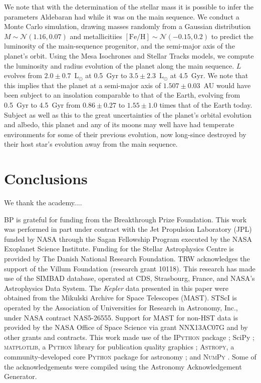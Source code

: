 \documentclass[modern]{aastex61}
\newcommand{\lsun}{\mbox{$\mathrm{L}_{\odot}$}\xspace}
\newcommand{\kepler}{\emph{Kepler}\xspace}
\begin{document}
We note that with the determination of the stellar mass it is possible to infer the parameters Aldebaran had while it was on the main sequence. We conduct a Monte Carlo simulation, drawing masses randomly from a Gaussian distribution $M \sim \mathcal{N}(1.16,0.07)$ and metallicitiies $[\text{Fe}/\text{H}] \sim \mathcal{N}(-0.15,0.2)$ \citep{decin2003}  to predict the luminosity of the main-sequence progenitor, and the semi-major axis of the planet's orbit.  %
Using the Mesa Isochrones and Stellar Tracks \citep[MIST:][]{mist0,mist1} models, we compute the luminosity and radius evolution of the planet along the main sequence. $L$ evolves from $2.0 \pm 0.7$~\lsun at 0.5~Gyr to $3.5 \pm 2.3$~\lsun at 4.5~Gyr. 
We note that this implies that the planet at a semi-major axis of $1.507 \pm 0.03$~AU would have been subject to an insolation comparable to that of the Earth, evolving from 0.5~Gyr to 4.5~Gyr from $0.86 \pm 0.27$ to $1.55 \pm 1.0$ times that of the Earth today. Subject as well as this to the great uncertainties of the planet's orbital evolution and albedo, this planet and any of its moons may well have had temperate environments for some of their previous evolution, now long-since destroyed by their host star's evolution away from the main sequence. 

\section{Conclusions}

\acknowledgments

We thank the academy....

BP is grateful for funding from the Breakthrough Prize Foundation. This work was performed in part under contract with the Jet Propulsion Laboratory (JPL) funded by NASA through the Sagan Fellowship Program executed by the NASA Exoplanet Science Institute.
Funding for the Stellar Astrophysics Centre is provided by The Danish National Research Foundation. TRW acknowledges the support of the Villum Foundation (research grant 10118).
This research has made use of the SIMBAD database, operated at CDS, Strasbourg, France, and NASA's Astrophysics Data System. The \kepler data presented in this paper were obtained from the Mikulski Archive for Space Telescopes (MAST). STScI is operated by the Association of Universities for Research in Astronomy, Inc., under NASA contract NAS5-26555. Support for MAST for non-HST data is provided by the NASA Office of Space Science via grant NNX13AC07G and by other grants and contracts.  This work made use of the \textsc{IPython} package \citep{PER-GRA:2007}; SciPy \citep{scipy};  \textsc{matplotlib}, a \textsc{Python} library for publication quality graphics \citep{Hunter:2007}; \textsc{Astropy}, a community-developed core \textsc{Python} package for astronomy \citep{2013A&A...558A..33A}; and \textsc{NumPy} \citep{van2011numpy}. Some of the acknowledgements were compiled using the Astronomy Acknowledgement Generator.
\end{document}
